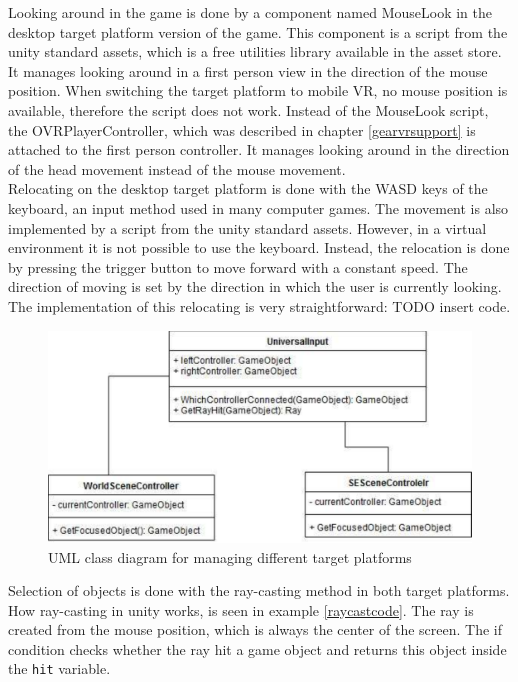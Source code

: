 Looking around in the game is done by a component named MouseLook in the desktop target platform version of the game. This component is a script from the unity standard assets, which is a free utilities library available in the asset store. It manages looking around in a first person view in the direction of the mouse position. When switching the target platform to mobile VR, no mouse position is available, therefore the script does not work. Instead of the MouseLook script, the OVRPlayerController, which was described in chapter \ref{gearvrsupport} is attached to the first person controller. It manages looking around in the direction of the head movement instead of the mouse movement.\\
Relocating on the desktop target platform is done with the WASD keys of the keyboard, an input method used in many computer games. The movement is also implemented by a script from the unity standard assets. However, in a virtual environment it is not possible to use the keyboard. Instead, the relocation is done by pressing the trigger button to move forward with a constant speed. The direction of moving is set by the direction in which the user is currently looking. The implementation of this relocating is very straightforward: TODO insert code.\\
\begin{figure}[h!]
  \includegraphics[width=13cm]{kapitel/eps/uml-input.pdf}
  \centering
  \caption{UML class diagram for managing different target platforms}
  \label{fig:uml-universalinput}
\end{figure}
Selection of objects is done with the ray-casting method in both target platforms. How ray-casting in unity works, is seen in example \ref{raycastcode}. The ray is created from the mouse position, which is always the center of the screen. The if condition checks whether the ray hit a game object and returns this object inside the \texttt{hit} variable.
